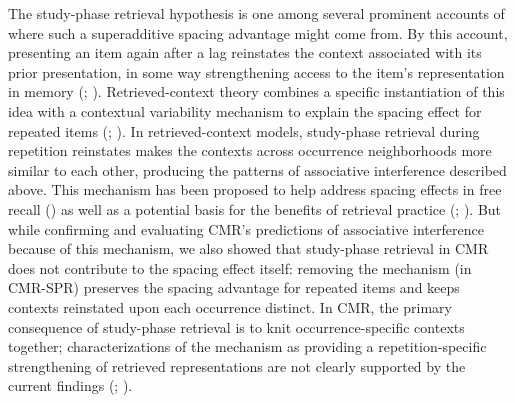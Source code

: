 \documentclass[
  man,
  floatsintext,
  longtable,
  nolmodern,
  notxfonts,
  notimes,
  draftfirst,
  colorlinks=true,linkcolor=blue,citecolor=blue,urlcolor=blue]{apa7}
\begin{document}
The study-phase retrieval hypothesis is one among several prominent
accounts of where such a superadditive spacing advantage might come
from. By this account, presenting an item again after a lag reinstates
the context associated with its prior presentation, in some way
strengthening access to the item's representation in memory
(;
).
Retrieved-context theory combines a specific instantiation of this idea
with a contextual variability mechanism to explain the spacing effect
for repeated items (; ). In retrieved-context models, study-phase retrieval during
repetition reinstates makes the contexts across occurrence neighborhoods
more similar to each other, producing the patterns of associative
interference described above. This mechanism has been proposed to help
address spacing effects in free recall
() as well as
a potential basis for the benefits of retrieval practice
(;
). But
while confirming and evaluating CMR's predictions of associative
interference because of this mechanism, we also showed that study-phase
retrieval in CMR does not contribute to the spacing effect itself:
removing the mechanism (in CMR-SPR) preserves the spacing advantage for
repeated items and keeps contexts reinstated upon each occurrence
distinct. In CMR, the primary consequence of study-phase retrieval is to
knit occurrence-specific contexts together; characterizations of the
mechanism as providing a repetition-specific strengthening of retrieved
representations are not clearly supported by the current findings
(;
).
\end{document}

